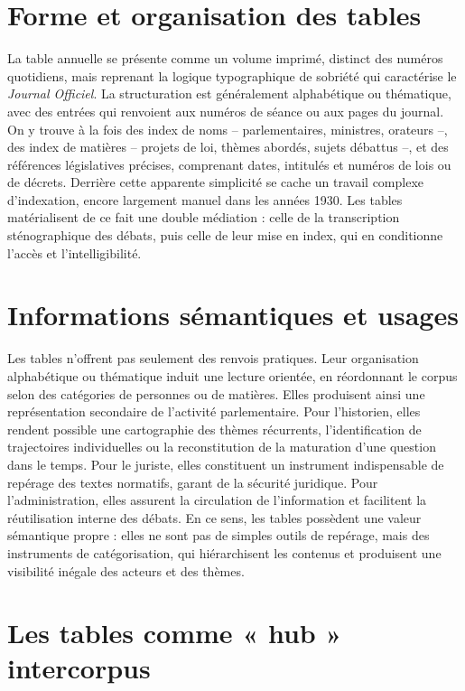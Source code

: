 \section{Forme et organisation des tables}

La table annuelle se présente comme un volume imprimé, distinct des numéros quotidiens, mais reprenant la logique typographique de sobriété qui caractérise le \emph{Journal Officiel}. La structuration est généralement alphabétique ou thématique, avec des entrées qui renvoient aux numéros de séance ou aux pages du journal. On y trouve à la fois des index de noms – parlementaires, ministres, orateurs –, des index de matières – projets de loi, thèmes abordés, sujets débattus –, et des références législatives précises, comprenant dates, intitulés et numéros de lois ou de décrets. Derrière cette apparente simplicité se cache un travail complexe d’indexation, encore largement manuel dans les années 1930. Les tables matérialisent de ce fait une double médiation : celle de la transcription sténographique des débats, puis celle de leur mise en index, qui en conditionne l’accès et l’intelligibilité.

\section{Informations sémantiques et usages}

Les tables n’offrent pas seulement des renvois pratiques. Leur organisation alphabétique ou thématique induit une lecture orientée, en réordonnant le corpus selon des catégories de personnes ou de matières. Elles produisent ainsi une représentation secondaire de l’activité parlementaire. Pour l’historien, elles rendent possible une cartographie des thèmes récurrents, l’identification de trajectoires individuelles ou la reconstitution de la maturation d’une question dans le temps. Pour le juriste, elles constituent un instrument indispensable de repérage des textes normatifs, garant de la sécurité juridique. Pour l’administration, elles assurent la circulation de l’information et facilitent la réutilisation interne des débats. En ce sens, les tables possèdent une valeur sémantique propre : elles ne sont pas de simples outils de repérage, mais des instruments de catégorisation, qui hiérarchisent les contenus et produisent une visibilité inégale des acteurs et des thèmes.

\section{Les tables comme « hub » intercorpus}


